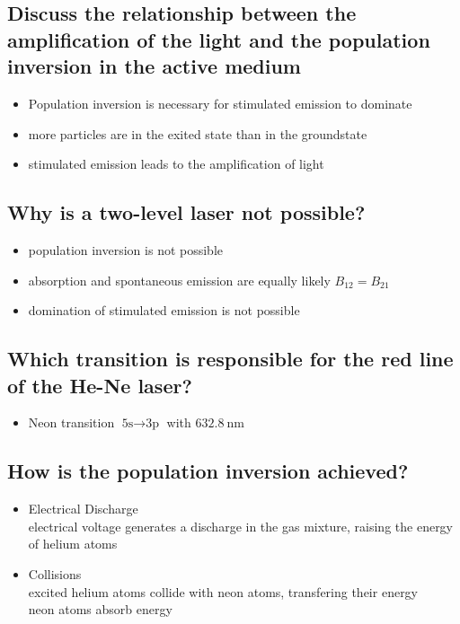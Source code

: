 \subsection{Discuss the relationship between the amplification of 
the light and the population inversion in the active medium}
\begin{itemize}
    \item Population inversion is necessary for stimulated emission to dominate
    \item more particles are in the exited state than in the groundstate
    \item stimulated emission leads to the amplification of light
\end{itemize}

\subsection{Why is a two-level laser not possible?}
\begin{itemize}
    \item population inversion is not possible
    \item absorption and spontaneous emission are equally likely $B_{12}=B_{21}$
    \item domination of stimulated emission is not possible
\end{itemize}

\subsection{Which transition is responsible for the red line of the He-Ne laser?}
\begin{itemize}
    \item Neon transition $\text{5s}\to\text{3p}$ with $\SI{632.8}{\nano\meter}$
\end{itemize}

\subsection{How is the population inversion achieved?}
\begin{itemize}
    \item Electrical Discharge \\
    \to electrical voltage generates a discharge in the gas mixture, raising the energy of helium atoms
    \item Collisions \\
    \to excited helium atoms collide with neon atoms, transfering their energy \\
    \to neon atoms absorb energy 
\end{itemize}

